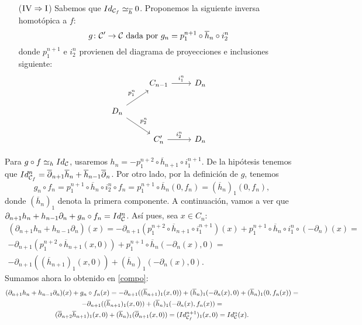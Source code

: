 \documentclass[HS.tex]{subfiles}
\begin{document}
\begin{dem}
\begin{itemize}
\item[($\textsc{IV}\Rightarrow \textsc{I}$)]
Sabemos que $Id_{\mathcal{C}_f} \simeq_{\overline{h}} 0$. Proponemos la siguiente inversa homotópica a $f$:
\[ g \colon \mathcal{C}' \to \mathcal{C} \text{ dada por }g_n = p_1^{n+1} \circ \overline{h}_n \circ i_2^n\]
donde $p_1^{n+1}$ e $i_2^n$ provienen del diagrama de proyecciones e inclusiones siguiente:
\[
\begin{tikzcd}
& C_{n-1} \arrow[r,"i_1^n"] & D_n\\
D_n \arrow[ur,"p_1^n"] \arrow[dr,"p_2^n"]\\
& C_n' \arrow[r,"i_2^n"] & D_n
\end{tikzcd}
\]
\end{itemize}
Para $g \circ f \simeq_h Id_{\mathcal{C}}$, usaremos $h_n = -p_1^{n+2} \circ \overline{h}_{n+1} \circ i_1^{n+1}$. De la hipótesis tenemos que $Id_{\mathcal{C}_f}^n=\overline{\partial}_{n+1}\overline{h}_n+\overline{h}_{n-1}\overline{\partial}_n$. Por otro lado, por la definición de $g$, tenemos
\begin{equation}\label{compo}
g_n\circ f_n=p_1^{n+1}\circ \overline{h}_n\circ i_2^n\circ f_n=p_1^{n+1}\circ\overline{h}_n(0,f_n)=(\overline{h}_n)_1(0,f_n),
\end{equation}
donde $(\overline{h}_n)_1$ denota la primera componente. A continuación, vamos a ver que $\partial_{n+1}h_n+h_{n-1}\partial_n+g_n\circ f_n=Id_{\mathcal{C}}^n$. Así pues, sea $x\in C_n$:
\begin{gather*}
(\partial_{n+1}h_n+h_{n-1}\partial_n)(x)=-\partial_{n+1}(p_1^{n+2}\circ\overline{h}_{n+1}\circ i_1^{n+1})(x)+p_1^{n+1}\circ\overline{h}_n\circ i_1^n\circ (-\partial_n)(x)=\\
-\partial_{n+1}(p_1^{n+2}\circ \overline{h}_{n+1}(x,0))+p_1^{n+1}\circ \overline{h}_n(-\partial_n(x),0)=\\
-\partial_{n+1}((\overline{h}_{n+1})_1(x,0))+(\overline{h}_n)_1(-\partial_n(x),0).
\end{gather*} 
Sumamos ahora lo obtenido en \ref{compo}:
\begin{gather*}
(\partial_{n+1}h_n+h_{n-1}\partial_n)(x)+g_n\circ f_n(x)=-\partial_{n+1}((\overline{h}_{n+1})_1(x,0))+(\overline{h}_n)_1(-\partial_n(x),0)+(\overline{h}_n)_1(0,f_n(x))=\\
-\partial_{n+1}((\overline{h}_{n+1})_1(x,0))+(\overline{h}_n)_1(-\partial_n(x),f_n(x))=\\
(\overline{\partial}_{n+2}\overline{h}_{n+1})_1(x,0)+(\overline{h}_n)_1(\overline{\partial}_{n+1}(x,0))=(Id_{\mathcal{C}_f}^{n+1})_1(x,0)=Id_{\mathcal{C}}^n(x).
\end{gather*}



\end{dem}
\end{document}
